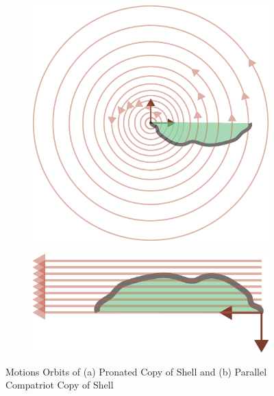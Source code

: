 \documentclass[letterpaper]{report}
\begin{document}
 \begin{figure}[ht]
   \begin{subfigure}[t]{0.5\textwidth}
     \centering
     \includegraphics[width=\linewidth,trim={10cm 7cm 0 5cm},clip]{ShapeForContact_hinge2.eps}
   \end{subfigure}
   \begin{subfigure}[t]{0.5\textwidth}
     \centering
     \includegraphics[width=\linewidth]{ShapeForContact_jaw.eps}
   \end{subfigure}
   \caption{Motions Orbits of (a) Pronated Copy of Shell and (b) Parallel Compatriot Copy of Shell}
 \end{figure}
\end{document}
